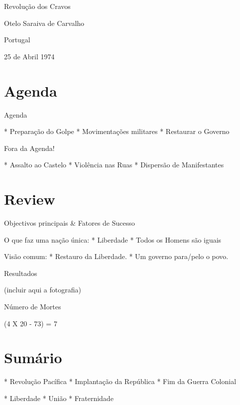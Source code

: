 \documentclass{beamer}
\begin{document}
Revolução dos Cravos

Otelo Saraiva de Carvalho

Portugal

25 de Abril 1974

\section{Agenda}

Agenda

  * Preparação do Golpe 
  * Movimentações militares
  * Restaurar o Governo

Fora da Agenda!

  * Assalto ao Castelo
  * Violência nas Ruas
  * Dispersão de Manifestantes

\section{Review}

Objectivos principais \& Fatores de Sucesso

O que faz uma nação única:
	* Liberdade
	* Todos os Homens são iguais

Visão comum:
  * Restauro da Liberdade.
  * Um governo para/pelo o povo.

Resultados

(incluir aqui a fotografia)

Número de Mortes

(4 X 20 - 73) = 7

\section{Sumário}

* Revolução Pacífica
* Implantação da República
* Fim da Guerra Colonial

* Liberdade
* União
* Fraternidade
\end{document}
